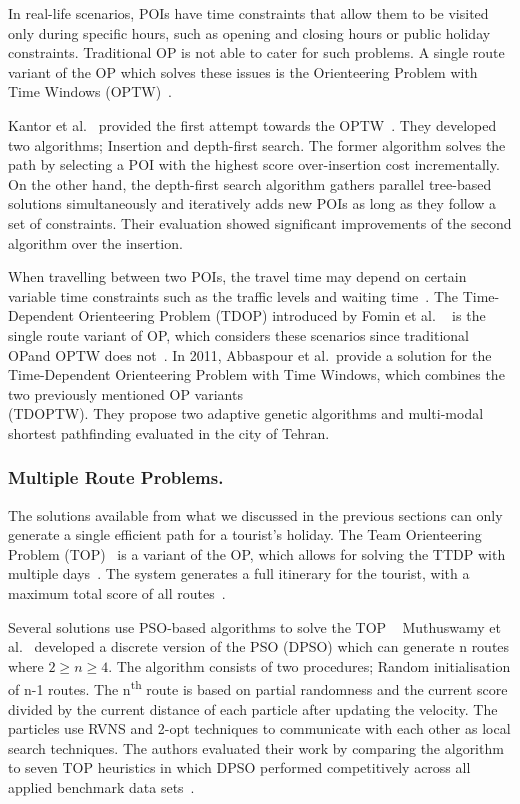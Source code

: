 In real-life scenarios, POIs have time constraints that allow them to be
visited only during specific hours, such as opening and closing hours or public
holiday constraints. Traditional OP is not able to cater for such problems. A
single route variant of the OP which solves these issues is the Orienteering
Problem with Time Windows (OPTW)~\cite{Gavalas2014a}. 

Kantor et al.~\cite{Kantor1992} provided the first attempt towards the
OPTW~\cite{Vansteenwegen2011}. They developed two algorithms;
Insertion and depth-first search. The former algorithm solves the path by
selecting a POI with the highest score over-insertion cost incrementally. On
the other hand, the depth-first search algorithm gathers parallel tree-based
solutions simultaneously and iteratively adds new POIs as long as they follow a
set of constraints. Their evaluation showed significant improvements of the
second algorithm over the insertion. 

When travelling between two POIs, the travel time may depend on certain
variable time constraints such as the traffic levels and waiting time~\cite{Herzog2020}.
The Time-Dependent Orienteering Problem (TDOP) introduced by Fomin et al.
~\cite{Fomin2002} is the single route variant of OP, which considers
these scenarios since traditional OPand OPTW does not~\cite{Gunawan2016}. In 2011, Abbaspour et
al.~\cite{Abbaspour2011}provide a solution for the
Time-Dependent Orienteering Problem with Time Windows, which combines the two
previously mentioned OP variants \\(TDOPTW).  They propose two adaptive genetic
algorithms and multi-modal shortest pathfinding evaluated in the city of
Tehran.


\subsubsection{Multiple Route Problems.}

The solutions available from what we discussed in the previous sections can only
generate a single efficient path for a tourist's holiday. The Team Orienteering
Problem (TOP)~\cite{Chao1996} is a variant of the OP, which allows for
solving the TTDP with multiple days~\cite{Sylejmani2017}. The system generates a full
itinerary for the tourist, with a maximum total score of all routes~\cite{Herzog2020}.

Several solutions use PSO-based algorithms to solve the TOP
~\cite{Muthuswamy2011,Wisittipanich2020,Yu2019}
Muthuswamy et al.~\cite{Muthuswamy2011} developed a discrete version of the PSO (DPSO)
which can generate n routes where $2 \geq n \geq 4$. The algorithm consists of two procedures;
Random initialisation of n-1 routes. The n\textsuperscript{th}
route is based on partial randomness and the current score divided by the current
distance of each particle after updating the velocity.  The
particles use RVNS and 2-opt techniques to communicate with each other as local
search techniques. The authors evaluated their work by comparing the algorithm
to seven TOP heuristics in which DPSO performed competitively across all
applied benchmark data sets~\cite{Gavalas2014a}.

